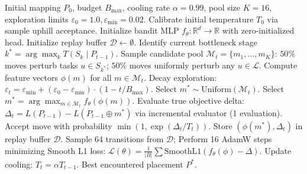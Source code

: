 \documentclass[10pt,conference]{IEEEtran}
\begin{document}
\begin{algorithm}[t]
  \caption{Contextual-Bandit-Guided Fixed SA (CB-SA)}
  \label{alg:cbsa}
  \begin{algorithmic}[1]
    \Require Initial mapping $P_0$, budget $B_{\max}$, cooling rate $\alpha=0.99$, pool size $K=16$, exploration limits $\varepsilon_0=1.0, \varepsilon_{\min}=0.02$.
    \State Calibrate initial temperature $T_0$ via sample uphill acceptance.
    \State Initialize bandit MLP $f_\theta : \mathbb{R}^d \to \mathbb{R}$ with zero-initialized head.
    \State Initialize replay buffer $\mathcal{D} \leftarrow \emptyset$.
      \State Identify current bottleneck stage $k^* = \arg\max_k T(S_k \mid P_{t-1})$.
      \State Sample candidate pool $\mathcal{M}_t = \{m_1, \ldots, m_K\}$:
        \State \quad $50\%$ moves perturb tasks $u \in S_{k^*}$;
        \State \quad $50\%$ moves uniformly perturb any $u \in \mathcal{L}$.
      \State Compute feature vectors $\phi(m)$ for all $m \in \mathcal{M}_t$.
      \State Decay exploration: $\varepsilon_t = \varepsilon_{\min} + (\varepsilon_0 - \varepsilon_{\min}) \cdot (1 - t / B_{\max})$.
        \State Select $m^* \sim \text{Uniform}(\mathcal{M}_t)$.
      \Else
        \State Select $m^* = \arg\max_{m \in \mathcal{M}_t} f_\theta(\phi(m))$.
      \EndIf
      \State Evaluate true objective delta: $\Delta_t = L(P_{t-1}) - L(P_{t-1} \oplus m^*)$ via incremental evaluator (1 evaluation).
      \State Accept move with probability $\min(1, \exp(\Delta_t / T_t))$.
      \State Store $(\phi(m^*), \Delta_t)$ in replay buffer $\mathcal{D}$.
        \State Sample 64 transitions from $\mathcal{D}$;
        \State Perform 16 AdamW steps minimizing Smooth L1 loss:
        \State $\mathcal{L}(\theta) = \frac{1}{|B|} \sum \text{SmoothL1}(f_\theta(\phi) - \Delta)$.
      \EndIf
      \State Update cooling: $T_t = \alpha T_{t-1}$.
    \EndFor
    \State \Return Best encountered placement $P^*$.
  \end{algorithmic}
\end{algorithm}
\end{document}
